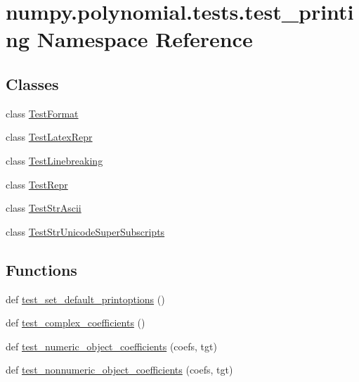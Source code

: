 \hypertarget{namespacenumpy_1_1polynomial_1_1tests_1_1test__printing}{}\section{numpy.\+polynomial.\+tests.\+test\+\_\+printing Namespace Reference}
\label{namespacenumpy_1_1polynomial_1_1tests_1_1test__printing}
\subsection*{Classes}
\begin{DoxyCompactItemize}
\item 
class \hyperlink{classnumpy_1_1polynomial_1_1tests_1_1test__printing_1_1TestFormat}{Test\+Format}
\item 
class \hyperlink{classnumpy_1_1polynomial_1_1tests_1_1test__printing_1_1TestLatexRepr}{Test\+Latex\+Repr}
\item 
class \hyperlink{classnumpy_1_1polynomial_1_1tests_1_1test__printing_1_1TestLinebreaking}{Test\+Linebreaking}
\item 
class \hyperlink{classnumpy_1_1polynomial_1_1tests_1_1test__printing_1_1TestRepr}{Test\+Repr}
\item 
class \hyperlink{classnumpy_1_1polynomial_1_1tests_1_1test__printing_1_1TestStrAscii}{Test\+Str\+Ascii}
\item 
class \hyperlink{classnumpy_1_1polynomial_1_1tests_1_1test__printing_1_1TestStrUnicodeSuperSubscripts}{Test\+Str\+Unicode\+Super\+Subscripts}
\end{DoxyCompactItemize}
\subsection*{Functions}
\begin{DoxyCompactItemize}
\item 
def \hyperlink{namespacenumpy_1_1polynomial_1_1tests_1_1test__printing_a84a298affe894b4298b7f731d3d6e791}{test\+\_\+set\+\_\+default\+\_\+printoptions} ()
\item 
def \hyperlink{namespacenumpy_1_1polynomial_1_1tests_1_1test__printing_ac0b8a670176efa9dbfb0b9ee94802b15}{test\+\_\+complex\+\_\+coefficients} ()
\item 
def \hyperlink{namespacenumpy_1_1polynomial_1_1tests_1_1test__printing_a68e9c67537104ac7005ade2236aa7c0e}{test\+\_\+numeric\+\_\+object\+\_\+coefficients} (coefs, tgt)
\item 
def \hyperlink{namespacenumpy_1_1polynomial_1_1tests_1_1test__printing_a5350ed5d226a3ce204711bd49df6e703}{test\+\_\+nonnumeric\+\_\+object\+\_\+coefficients} (coefs, tgt)
\end{DoxyCompactItemize}


